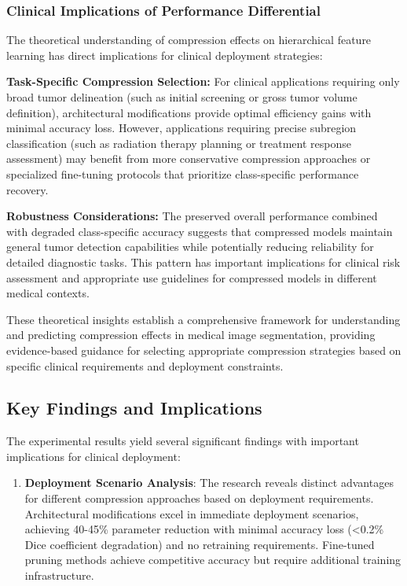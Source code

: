 \documentclass[12pt,a4paper]{article}
\begin{document}
\begin{enumerate}
\subsubsection{Clinical Implications of Performance Differential}

The theoretical understanding of compression effects on hierarchical feature learning has direct implications for clinical deployment strategies:

\textbf{Task-Specific Compression Selection:} For clinical applications requiring only broad tumor delineation (such as initial screening or gross tumor volume definition), architectural modifications provide optimal efficiency gains with minimal accuracy loss. However, applications requiring precise subregion classification (such as radiation therapy planning or treatment response assessment) may benefit from more conservative compression approaches or specialized fine-tuning protocols that prioritize class-specific performance recovery.

\textbf{Robustness Considerations:} The preserved overall performance combined with degraded class-specific accuracy suggests that compressed models maintain general tumor detection capabilities while potentially reducing reliability for detailed diagnostic tasks. This pattern has important implications for clinical risk assessment and appropriate use guidelines for compressed models in different medical contexts.

These theoretical insights establish a comprehensive framework for understanding and predicting compression effects in medical image segmentation, providing evidence-based guidance for selecting appropriate compression strategies based on specific clinical requirements and deployment constraints.

\subsection{Key Findings and Implications}

The experimental results yield several significant findings with important implications for clinical deployment:

\begin{enumerate}
\item \textbf{Deployment Scenario Analysis}: The research reveals distinct advantages for different compression approaches based on deployment requirements. Architectural modifications excel in immediate deployment scenarios, achieving 40-45\% parameter reduction with minimal accuracy loss (<0.2\% Dice coefficient degradation) and no retraining requirements. Fine-tuned pruning methods achieve competitive accuracy but require additional training infrastructure.


\end{enumerate}
\end{enumerate}
\end{document}
